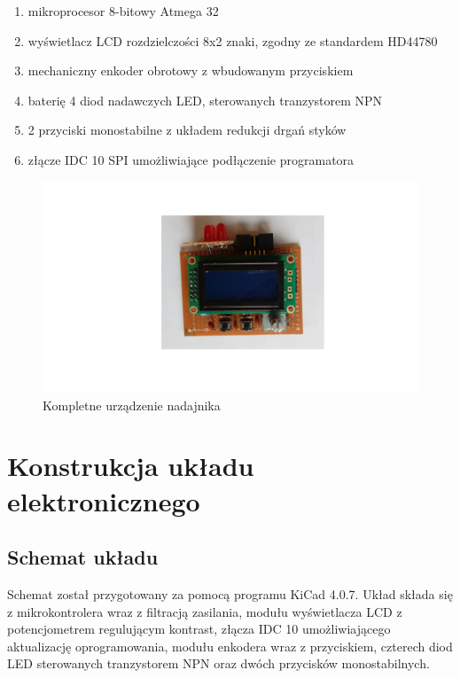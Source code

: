 \documentclass{article}
\begin{document}
\begin{enumerate}
	\item	mikroprocesor 8-bitowy Atmega 32

	\item	wyświetlacz LCD rozdzielczości 8x2 znaki, zgodny ze standardem HD44780

	\item	mechaniczny enkoder obrotowy z wbudowanym przyciskiem

	\item	baterię 4 diod nadawczych LED, sterowanych tranzystorem NPN

	\item	2 przyciski monostabilne z układem redukcji drgań styków

	\item 	złącze IDC 10 SPI umożliwiające podłączenie programatora
\end{enumerate}

\begin{figure}[h!]
	\includegraphics[width=\textwidth]{img/morse_main_view.png}
	\caption{Kompletne urządzenie nadajnika}
	\label{fig:zdjecie1}
\end{figure}

\newpage
\section{Konstrukcja układu elektronicznego}
\subsection{Schemat układu}
Schemat został przygotowany za pomocą programu KiCad 4.0.7. Układ składa się z mikrokontrolera wraz z filtracją zasilania, modułu wyświetlacza LCD z potencjometrem regulującym kontrast, złącza IDC 10 umożliwiającego aktualizację oprogramowania, modułu enkodera wraz z przyciskiem, czterech diod LED sterowanych tranzystorem NPN oraz dwóch przycisków monostabilnych.
\end{document}
